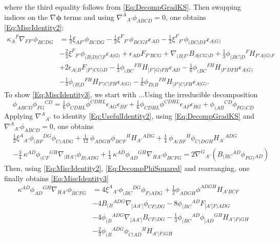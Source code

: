 \documentclass[10pt,a4paper]{article}
\theoremstyle{plain}
\begin{document}
where the third equality follows from \eqref{Eq:DecompGradKS}. Then swapping indices on the $\nabla\bm\phi$ terms and using $\nabla^A{}_{A'}\phi_{ABCD}=0$, one obtains \eqref{Eq:MiscIdentity2}:
\begin{align*}
    \kappa_{A}{}^{F} \nabla_{FF'}\phi_{BCDG} &= \tfrac{1}{3} \xi_{AF'}
    \phi_{BCDG} - \tfrac{1}{3} \xi^{F}{}_{F'} \phi_{BCGF}
    \epsilon_{AD} - \tfrac{1}{3}
    \xi^{F}{}_{F'}\phi_{(BC|DF}\epsilon_{A|G)} \nonumber \\ & -
    \tfrac{2}{3} \xi^{F}{}_{F'}\phi_{(B|D|C|F}\epsilon_{A|G)} +
    \epsilon_{AD} F_{F'BCG} + \nabla_{(B|F'}B_{A|CG)D} + \tfrac{1}{3}
    \phi_{(BC|D}{}^{F}H_{F'A|G)F} \nonumber \\& + 2
    \epsilon_{A(B}F_{|F'\vert CG)D} - \tfrac{1}{3}
    \phi_{(BC}{}^{FH}H_{|F'|G)FH}\epsilon_{AD} - \tfrac{1}{6}
    \phi_{(BC}{}^{FH}H_{|F'DFH}\epsilon_{A|G)} \nonumber\\ & -
    \tfrac{1}{3} \phi_{(B|D}{}^{FH}H_{F'|C|FH}\epsilon_{A|G)} -
    \tfrac{1}{6}
    \phi_{D(B}{}^{FH}H_{|F'|C|FH}\epsilon_{A|G)}.
\end{align*}
To show \eqref{Eq:MiscIdentity3}, we start with ...Using the irreducible decomposition
\begin{equation}
\phi_{ABCD} \phi_{FG}{}^{CD} = \tfrac{1}{6} \phi_{CDHL} \phi^{CDHL}
\epsilon_{AG} \epsilon_{BF} + \tfrac{1}{6} \phi_{CDHL} \phi^{CDHL}
\epsilon_{AF} \epsilon_{BG} +
\phi_{(AB}{}^{CD}\phi_{FG)CD} \label{Eq:DecompPhiSquared}
\end{equation}
Applying $\nabla^A{}_{A'}$ to identity \eqref{Eq:UsefulIdentity2}, using \eqref{Eq:DecompGradKS} and $\nabla^A{}_{A'}\phi_{ABCD}=0$, one obtains
\begin{align*}
&\tfrac{1}{2} \xi^{A}{}_{A'} \phi_{(BF}{}^{DG} \phi_{C)ADG} + \tfrac{1}{12} \
\phi_{ADGH} \phi_{BCF}{}^{H} H_{A'}{}^{ADG} + \tfrac{1}{4} \
\phi_{A(BF}{}^{H} \phi_{C)DGH} H_{A'}{}^{ADG}  \\
&-  \tfrac{3}{4} \
\kappa^{AD} \phi_{(CF}{}^{GH} \nabla_{\vert HA'\vert}\phi_{B)ADG} + \tfrac{1}{4} \
\kappa^{AD} \phi_{AD}{}^{GH} \nabla_{HA'}\phi_{BCFG} = 2 \nabla^G{}_{A'}(B_{(BC}{}^{AD} \phi_{FG)}{}_{AD})	
\end{align*}
Then, using \eqref{Eq:MiscIdentity2}, \eqref{Eq:DecompPhiSquared} and rearranging, one finally obtains \eqref{Eq:MiscIdentity3} 
\begin{align*}
    \kappa^{AD} \phi_{AD}{}^{GH} \nabla_{HA'}\phi_{BCFG} &= 4
    \xi^{A}{}_{A'}\phi_{(BC}{}^{DG}\phi_{F)ADG} + \tfrac{1}{2}
    \phi_{ADGH} \phi^{ADGH} H_{A'BCF} \nonumber\\ & - 4
    B_{(B}{}^{ADG}\nabla_{|AA'|}\phi_{CF)DG} - 8
    \phi_{(BC}{}^{AD}F_{|A'|F)ADG}\nonumber \\ & - 4
    \phi_{(B}{}^{ADG}\nabla_{|AA'|}B_{CF)DG} - \tfrac{1}{3}
    \phi_{(BC}{}^{AD}\phi_{|AD}{}^{GH}H_{A'|F)GH}\nonumber \\ & -
    \tfrac{2}{3}
    \phi_{(B}{}^{ADG}\phi_{C|AD}{}^{H}H_{A'|F)GH} \label{Eq:MiscIdentity3}
\end{align*}
\end{document}
